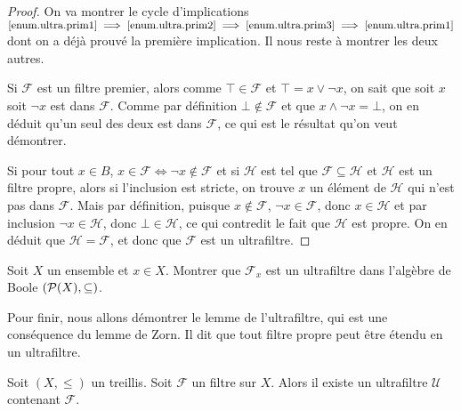\begin{proof}
  On va montrer le cycle d'implications
  $\ref{enum.ultra.prim1} \implies\ref{enum.ultra.prim2}
  \implies\ref{enum.ultra.prim3}\implies\ref{enum.ultra.prim1}$
  dont on a déjà prouvé la première implication. Il nous reste à montrer les
  deux autres.
  
  Si $\mathcal F$ est un filtre premier, alors comme $\top \in \mathcal F$ et
  $\top = x \lor \lnot x$, on sait que soit $x$ soit $\lnot x$ est dans
  $\mathcal F$. Comme par définition $\bot\notin\mathcal F$ et que
  $x\land\lnot x = \bot$, on en déduit qu'un seul des deux est dans
  $\mathcal F$, ce qui est le résultat qu'on veut démontrer.

  Si pour tout $x\in B$, $x\in\mathcal F\iff\lnot x\notin\mathcal F$ et
  si $\mathcal H$ est tel que $\mathcal F\subseteq\mathcal H$ et $\mathcal H$
  est un filtre propre, alors si l'inclusion est stricte, on trouve $x$ un
  élément de $\mathcal H$ qui n'est pas dans $\mathcal F$. Mais par définition,
  puisque $x\notin\mathcal F$, $\lnot x\in\mathcal F$, donc $x\in \mathcal H$ et
  par inclusion $\lnot x \in \mathcal H$, donc $\bot\in \mathcal H$, ce qui
  contredit le fait que $\mathcal H$ est propre. On en déduit que
  $\mathcal H = \mathcal F$, et donc que $\mathcal F$ est un ultrafiltre.
\end{proof}

\begin{exercise}
  Soit $X$ un ensemble et $x\in X$. Montrer que $\mathcal F_x$ est un
  ultrafiltre dans l'algèbre de Boole $(\mathcal{P}(X),\subseteq)$.
\end{exercise}

Pour finir, nous allons démontrer le lemme de l'ultrafiltre, qui est une
conséquence du lemme de Zorn. Il dit que tout filtre propre peut être étendu en
un ultrafiltre.

\begin{theorem}\label{thm.ultrafilter.lemma}
  Soit $(X,\leq)$ un treillis. Soit $\mathcal F$ un filtre sur $X$. Alors il
  existe un ultrafiltre $\mathcal U$ contenant $\mathcal F$.
\end{theorem}

